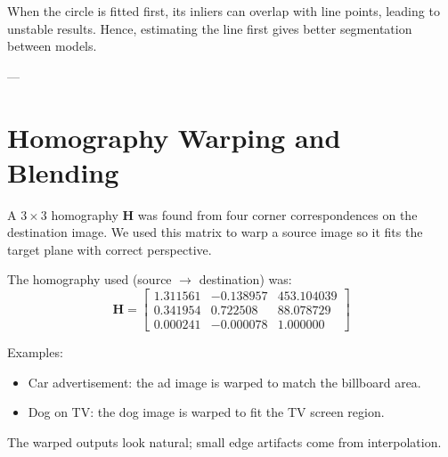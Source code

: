 \documentclass[11pt,a4paper]{article}
\begin{document}
When the circle is fitted first, its inliers can overlap with line points, leading to unstable results.  
Hence, estimating the line first gives better segmentation between models.

---

\section{Homography Warping and Blending}
A $3\times3$ homography $\mathbf{H}$ was found from four corner correspondences on the destination image. We used this matrix to warp a source image so it fits the target plane with correct perspective.

The homography used (source $\rightarrow$ destination) was:
\[
\mathbf{H}=\begin{bmatrix}
1.311561 & -0.138957 & 453.104039 \\
0.341954 & 0.722508 & 88.078729 \\
0.000241 & -0.000078 & 1.000000
\end{bmatrix}
\]

Examples:
\begin{itemize}
\item Car advertisement: the ad image is warped to match the billboard area.
\item Dog on TV: the dog image is warped to fit the TV screen region.
\end{itemize}

The warped outputs look natural; small edge artifacts come from interpolation.
\end{document}
